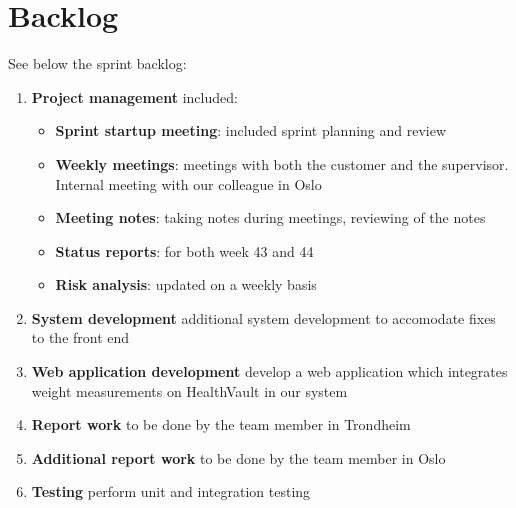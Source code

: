 \section{Backlog}
See below the sprint backlog:
\begin{enumerate}[1.]
\item \textbf{Project management} included:
	\begin{itemize}
		\item \textbf{Sprint startup meeting}:
			included sprint planning and review
		\item \textbf{Weekly meetings}: 
			meetings with both the customer and the supervisor. Internal meeting with our colleague in Oslo
		\item \textbf{Meeting notes}:
			taking notes during meetings, reviewing of the notes
		\item \textbf{Status reports}:
			for both week 43 and 44
		\item \textbf{Risk analysis}:
			updated on a weekly basis
	\end{itemize}
	\item \textbf{System development}
		additional system development to accomodate fixes to the front end
	\item \textbf{Web application development}
		develop a web application which integrates weight measurements
		on HealthVault in our system
	\item \textbf{Report work}
		to be done by the team member in Trondheim
	\item \textbf{Additional report work}
		to be done by the team member in Oslo
	\item \textbf{Testing}
		perform unit and integration testing
\end{enumerate}

